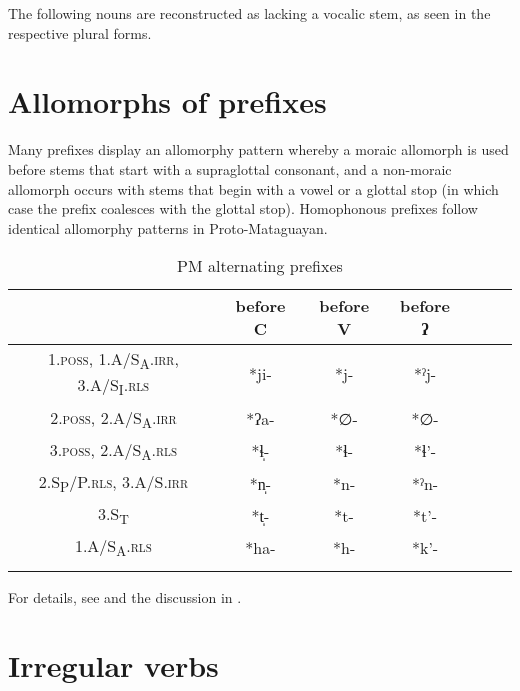 The following nouns are reconstructed as lacking a vocalic stem, as seen in the respective plural forms.

\begin{exe}
    \ex \yicaay
    \ex \namen
    \ex \water
    \ex \tail
    \ex \hand
    \ex \thorncutjan
    \ex \winter
    \ex \languageword
    \ex \zorzal
    \ex \rain
    \ex \starn
    \ex \costume
    \ex \cicada
    \ex \wildcat
    \ex \kingvulture
    \ex \cat
    \ex \basetrunk
    \ex \snake
    \ex \chaja
    \ex \nest
    \ex \stagnant
    \ex \earth
    \ex \skin
    \ex \meat
\end{exe}

\section{Allomorphs of prefixes}

Many prefixes display an allomorphy pattern whereby a moraic allomorph is used before stems that start with a supraglottal consonant, and a non-moraic allomorph occurs with stems that begin with a vowel or a glottal stop (in which case the prefix coalesces with the glottal stop). Homophonous prefixes follow identical allomorphy patterns in Proto-Mataguayan.

\begin{table}
\caption{PM alternating prefixes}
\label{PM-alternating-prefixes}
 \begin{tabular}{ccccccc}
  \lsptoprule
          & before C & before V & before ʔ\\\midrule
  1.\textsc{poss}, 1.A/S\textsubscript{A}.{\textsc{irr}}, 3.A/S\textsubscript{I}.{\textsc{rls}} & *ji- & *j- & *ˀj-\\
  2.\textsc{poss}, 2.A/S\textsubscript{A}.{\textsc{irr}} & *ʔa- & *∅- & *∅-\\
  3.\textsc{poss}, 2.A/S\textsubscript{A}.{\textsc{rls}} & *ɬ̩- & *ɬ- & *ɬ’-\\
  2.S\textsubscript{P}/P.{\textsc{rls}}, 3.A/S.{\textsc{irr}} & *n̩- & *n- & *ˀn-\\
  3.S\textsubscript{T} & *t̩- & *t- & *t’-\\
  1.A/S\textsubscript{A}.{\textsc{rls}} & *ha- & *h- & *k’-\\
  \lspbottomrule
 \end{tabular}
\end{table}

For details, see  and the discussion in .

\section{Irregular verbs} \label{irrv}

